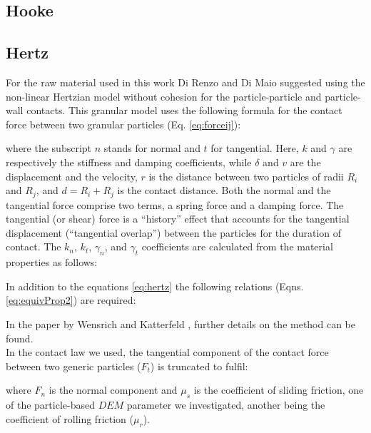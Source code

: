 \subsection{Hooke}
\label{subsec:hooke}

\subsection{Hertz}
\label{subsec:hertz}

For the raw material used in this work 
Di Renzo and Di Maio \cite{RefWorks:145} suggested using the non-linear
Hertzian model without cohesion for the particle-particle and particle-wall contacts. 
This granular model uses the following formula for the contact force between two granular particles (Eq. \ref{eq:forceij}):

where the subscript $n$ stands for normal and $t$ for tangential. 
Here, $k$ and $\gamma$ are respectively the stiffness and damping coefficients, 
while $\delta$ and $v$ are the displacement and the velocity, $r$ is the
distance between two particles of radii $R_i$ and $R_j$, and $d = R_i + R_j $ is
the contact distance.
Both the normal and the tangential
force comprise two terms, a spring force and a damping force. 
The tangential (or shear) force is a ``history'' effect that accounts for the
tangential displacement (``tangential overlap'') between the particles for the
duration of contact.
The $k_n$, $k_t$, $\gamma_n$, and $\gamma_t$ coefficients are calculated from
the material properties as follows:

In addition to the equations \ref{eq:hertz} the following relations (Eqns. \ref{eq:equivProp2}) are required:


In the paper by Wensrich and Katterfeld \cite{RefWorks:87}, further details on
the method can be found.\\
In the contact law we used, 
the tangential component of the contact force between two generic particles
($F_t$) is truncated to fulfil:


where $F_n$ is the normal component and $\mu_s$ is the coefficient of sliding
friction, one of the particle-based $DEM$ parameter we investigated, 
another being the coefficient of rolling friction ($\mu_r$). 

